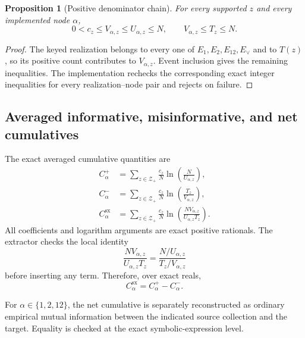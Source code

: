\documentclass[11pt]{article}
\newtheorem{proposition}[theorem]{Proposition}
\theoremstyle{definition}
\newcommand{\sx}{\mathrm{sx}}
\begin{document}
\begin{proposition}[Positive denominator chain]\label{prop:mass-chain}
For every supported $z$ and every implemented node $\alpha$,
\begin{equation}
  0<c_z\le V_{\alpha,z}\le U_{\alpha,z}\le N,
  \qquad
  V_{\alpha,z}\le T_z\le N.
\end{equation}
\end{proposition}

\begin{proof}
The keyed realization belongs to every one of $E_1,E_2,E_{12},E_\vee$ and to $T(z)$, so its
positive count contributes to $V_{\alpha,z}$.  Event inclusion gives the remaining inequalities.
The implementation rechecks the corresponding exact integer inequalities for every
realization--node pair and rejects on failure.
\end{proof}

\subsection{Averaged informative, misinformative, and net cumulatives}

The exact averaged cumulative quantities are
\begin{align}
  C^+_\alpha
    &=\sum_{z\in\mathcal{Z}_{+}}\frac{c_z}{N}
      \ln\!\left(\frac{N}{U_{\alpha,z}}\right),\label{eq:cplus}\\
  C^-_\alpha
    &=\sum_{z\in\mathcal{Z}_{+}}\frac{c_z}{N}
      \ln\!\left(\frac{T_z}{V_{\alpha,z}}\right),\label{eq:cminus}\\
  C^\sx_\alpha
    &=\sum_{z\in\mathcal{Z}_{+}}\frac{c_z}{N}
      \ln\!\left(\frac{N V_{\alpha,z}}
                       {U_{\alpha,z}T_z}\right).\label{eq:cnet}
\end{align}
All coefficients and logarithm arguments are exact positive rationals.  The extractor checks the
local identity
\begin{equation}
  \frac{N V_{\alpha,z}}{U_{\alpha,z}T_z}
  =
  \frac{N/U_{\alpha,z}}{T_z/V_{\alpha,z}}
\end{equation}
before inserting any term.  Therefore, over exact reals,
\begin{equation}
  C^\sx_\alpha=C^+_\alpha-C^-_\alpha.
\end{equation}

For $\alpha\in\{1,2,12\}$, the net cumulative is separately reconstructed as ordinary empirical
mutual information between the indicated source collection and the target.  Equality is checked
at the exact symbolic-expression level.
\end{document}
